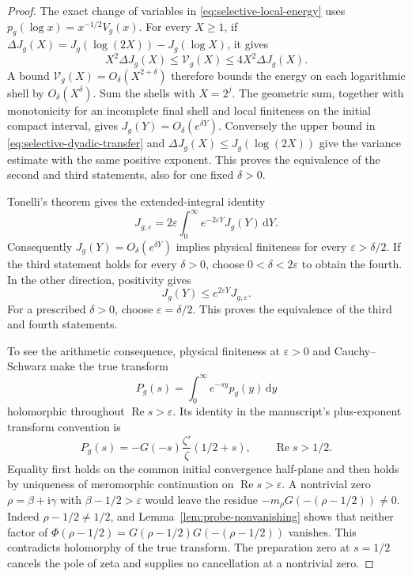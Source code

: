 \documentclass[11pt]{article}
\numberwithin{equation}{section}
\theoremstyle{definition}
\theoremstyle{remark}
\newcommand{\Rea}{\operatorname{Re}}
\newcommand{\ii}{\mathrm i}
\newcommand{\dd}{\,\mathrm d}
\begin{document}
\begin{proof}
The exact change of variables in \eqref{eq:selective-local-energy}
uses \(p_g(\log x)=x^{-1/2}V_g(x)\). For every \(X\ge1\), if
\(\Delta J_g(X)=J_g(\log(2X))-J_g(\log X)\), it gives
\begin{equation}\label{eq:selective-dyadic-transfer}
X^2\Delta J_g(X)\le\mathcal V_g(X)
\le4X^2\Delta J_g(X).
\end{equation}
A bound \(\mathcal V_g(X)=O_\delta(X^{2+\delta})\) therefore
bounds the energy on each logarithmic shell by \(O_\delta(X^\delta)\).
Sum the shells with \(X=2^j\). The geometric sum, together with
monotonicity for an incomplete final shell and local finiteness on
the initial compact interval, gives
\(J_g(Y)=O_\delta(e^{\delta Y})\).
Conversely the upper bound in \eqref{eq:selective-dyadic-transfer}
and \(\Delta J_g(X)\le J_g(\log(2X))\) give the variance estimate
with the same positive exponent. This proves the equivalence of the
second and third statements, also for one fixed \(\delta>0\).

Tonelli's theorem gives the extended-integral identity
\begin{equation}\label{eq:selective-weighted-transfer}
J_{g,\varepsilon}=2\varepsilon\int_0^\infty
 e^{-2\varepsilon Y}J_g(Y)\dd Y.
\end{equation}
Consequently \(J_g(Y)=O_\delta(e^{\delta Y})\) implies physical
finiteness for every \(\varepsilon>\delta/2\). If the third
statement holds for every \(\delta>0\), choose
\(0<\delta<2\varepsilon\) to obtain the fourth. In the other
direction, positivity gives
\[
J_g(Y)\le e^{2\varepsilon Y}J_{g,\varepsilon}.
\]
For a prescribed \(\delta>0\), choose \(\varepsilon=\delta/2\).
This proves the equivalence of the third and fourth statements.

To see the arithmetic consequence, physical finiteness at
\(\varepsilon>0\) and Cauchy--Schwarz make the true transform
\[
P_g(s)=\int_0^\infty e^{-sy}p_g(y)\dd y
\]
holomorphic throughout \(\Rea s>\varepsilon\). Its identity in
the manuscript's plus-exponent transform convention is
\begin{equation}\label{eq:selective-subpower-laplace}
P_g(s)=-G(-s)\frac{\zeta'}{\zeta}(1/2+s),
\qquad\Rea s>1/2.
\end{equation}
Equality first holds on the common initial convergence half-plane
and then holds by uniqueness of meromorphic continuation on
\(\Rea s>\varepsilon\). A nontrivial zero
\(\rho=\beta+\ii\gamma\) with \(\beta-1/2>\varepsilon\)
would leave the residue \(-m_\rho G(-(\rho-1/2))\ne0\).
Indeed \(\rho-1/2\ne1/2\), and
Lemma~\ref{lem:probe-nonvanishing} shows that neither factor of
\(\Phi(\rho-1/2)=G(\rho-1/2)G(-(\rho-1/2))\) vanishes.
This contradicts holomorphy of the true transform. The preparation
zero at \(s=1/2\) cancels the pole of zeta and supplies no
cancellation at a nontrivial zero.


\end{proof}
\end{document}
